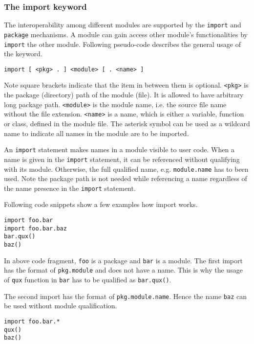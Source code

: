 \documentclass[10pt,a4paper]{article}
\begin{document}
\subsubsection{The import keyword}
The interoperability among different modules are supported by the 
\lstinline$import$ and \lstinline$package$ mechanisms. 
A module can gain access other module's functionalities by \lstinline$import$
the other module. Following pseudo-code describes the general usage of the
keyword.

\begin{verbatim}
import [ <pkg> . ] <module> [ . <name> ]
\end{verbatim}

Note square brackets indicate that the item in between them is optional.
\verb$<pkg>$ is the package (directory) path of the module (file).
It is allowed to have arbitrary long package path.
\verb$<module>$ is the module name, i.e. the source file name without
the file extension.
\verb$<name>$ is a name, which is either a variable, function or class,
defined in the module file. The asterisk symbol can be used as a wildcard
name to indicate all names in the module are to be imported. 

An \lstinline$import$ statement makes names in a module visible to user code.
When a name is given in the \lstinline$import$ statement, 
it can be referenced without qualifying with its module. 
Otherwise, the full qualified name, e.g. \verb$module.name$ has to been used.
Note the package path is not needed while referencing a name regardless
of the name presence in the \lstinline$import$ statement.

Following code snippets show a few examples how import works.

\begin{lstlisting}[caption=import statement example]
import foo.bar
import foo.bar.baz
bar.qux()
baz()
\end{lstlisting}

In above code fragment, \lstinline$foo$ is a package and 
\lstinline$bar$ is a module. 
The first import has the format of \verb$pkg.module$ and does not have
a name. 
This is why the usage of \lstinline$qux$ function in \lstinline$bar$ 
has to be qualified as \lstinline$bar.qux()$.

The second import has the format of \verb$pkg.module.name$. 
Hence the name \lstinline$baz$ can be used without module qualification.

\begin{lstlisting}[caption=import statement with the wildcard character]
import foo.bar.*
qux()
baz()
\end{lstlisting}
\end{document}
